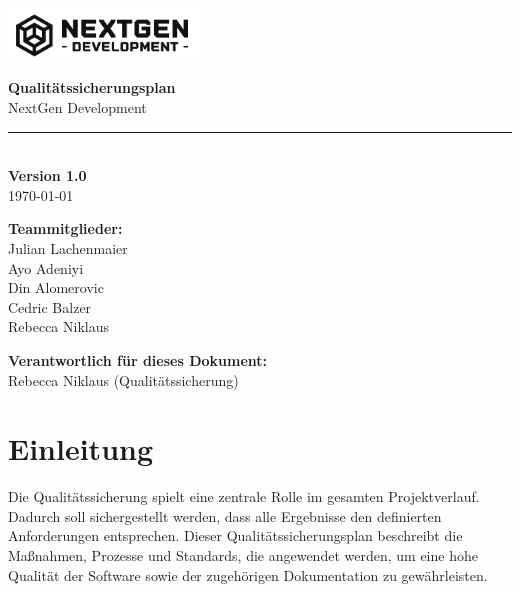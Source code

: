 \documentclass[a4paper,12pt]{article}
\begin{document}
\begin{titlepage}
    \begin{flushleft}
        \includegraphics[width=5cm]{logo.png}
    \end{flushleft}

    \vfill

    \begin{center}
        \Huge \textbf{Qualitätssicherungsplan} \\[1.0cm]
        \Large NextGen Development \\[0.5cm]
        \textcolor{gray}{\rule{0.8\textwidth}{0.4pt}} \\[0.5cm]
        \textbf{Version 1.0} \\[0.5cm] %
        \large \today \\[1.5cm]
    \end{center}

    \vfill

    \noindent
    \begin{minipage}[t]{0.45\textwidth}
        \textbf{Teammitglieder:}\\
        Julian Lachenmaier\\
        Ayo Adeniyi\\
        Din Alomerovic\\
        Cedric Balzer\\
        Rebecca Niklaus\\
    \end{minipage}%
    \hspace{1cm}
    \begin{minipage}[t]{0.45\textwidth}
        \textbf{Verantwortlich für dieses Dokument:}\\
        Rebecca Niklaus (Qualitätssicherung)\\
    \end{minipage}

\end{titlepage}

\tableofcontents
\newpage

\section{Einleitung}
Die Qualitätssicherung spielt eine zentrale Rolle im gesamten Projektverlauf. Dadurch soll sichergestellt werden, dass alle Ergebnisse den definierten Anforderungen entsprechen. Dieser Qualitätssicherungsplan beschreibt die Maßnahmen, Prozesse und Standards, die angewendet werden, um eine hohe Qualität der Software sowie der zugehörigen Dokumentation zu gewährleisten.
\end{document}
